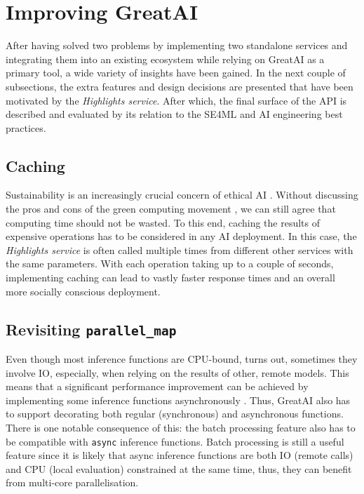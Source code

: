 \section{Improving GreatAI}

After having solved two problems by implementing two standalone services and integrating them into an existing ecosystem while relying on GreatAI as a primary tool, a wide variety of insights have been gained. In the next couple of subsections, the extra features and design decisions are presented that have been motivated by the \textit{Highlights service}. After which, the final surface of the API is described and evaluated by its relation to the SE4ML \cite{serban2020adoption,serban2021practices} and AI engineering \cite{john2020architecting,john2020ai} best practices.

\subsection{Caching}

Sustainability is an increasingly crucial concern of ethical AI \cite{van2021sustainable}. Without discussing the pros and cons of the green computing movement \cite{10.1145/1400181.1400186}, we can still agree that computing time should not be wasted. To this end, caching the results of expensive operations has to be considered in any AI deployment. In this case, the \textit{Highlights service} is often called multiple times from different other services with the same parameters. With each operation taking up to a couple of seconds, implementing caching can lead to vastly faster response times and an overall more socially conscious deployment.

\subsection{Revisiting \texttt{parallel\_map}}

Even though most inference functions are CPU-bound, turns out, sometimes they involve IO, especially, when relying on the results of other, remote models. This means that a significant performance improvement can be achieved by implementing some inference functions asynchronously \cite{tilkov2010node}. Thus, GreatAI also has to support decorating both regular (synchronous) and asynchronous functions. There is one notable consequence of this: the batch processing feature also has to be compatible with \texttt{async} inference functions. Batch processing is still a useful feature since it is likely that async inference functions are both IO (remote calls) and CPU (local evaluation) constrained at the same time, thus, they can benefit from multi-core parallelisation. 

